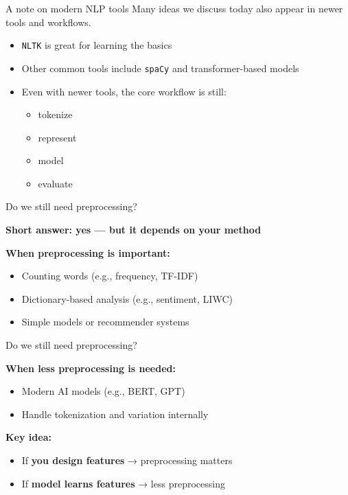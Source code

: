 \documentclass[handout]{beamer}
\begin{document}
\begin{frame}{A note on modern NLP tools}
Many ideas we discuss today also appear in newer tools and workflows.

\begin{itemize}
\item \texttt{NLTK} is great for learning the basics
\item Other common tools include \texttt{spaCy} and transformer-based models
\item Even with newer tools, the core workflow is still:
	\begin{itemize}
		\item tokenize
		\item represent
		\item model
		\item evaluate
	\end{itemize}
\end{itemize}
\end{frame}

\begin{frame}{Do we still need preprocessing?}

\textbf{Short answer: yes --- but it depends on your method}

\vspace{0.7em}

\textbf{When preprocessing is important:}
\begin{itemize}
\item Counting words (e.g., frequency, TF-IDF)
\item Dictionary-based analysis (e.g., sentiment, LIWC)
\item Simple models or recommender systems
\end{itemize}

\end{frame}

\begin{frame}{Do we still need preprocessing?}

\textbf{When less preprocessing is needed:}
\begin{itemize}
\item Modern AI models (e.g., BERT, GPT)
\item Handle tokenization and variation internally
\end{itemize}

\vspace{0.7em}

\textbf{Key idea:}
\begin{itemize}
\item If \textbf{you design features} → preprocessing matters
\item If \textbf{model learns features} → less preprocessing
\end{itemize}

\end{frame}
\end{document}
